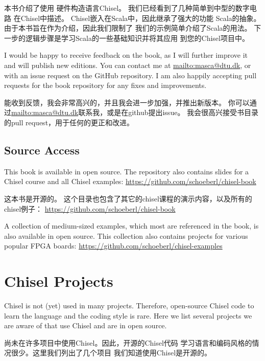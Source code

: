 \documentclass[%
    10pt,
    headinclude, footexclude,
    openright, %
    notitlepage,
    cleardoubleempty,
    headsepline,
    pointlessnumbers,
    bibtotoc, idxtotoc,
    ]{scrbook}
\begin{document}
{{本书介绍了使用
硬件构造语言Chisel。
我们已经看到了几种简单到中型的数字电路
在Chisel中描述。
Chisel嵌入在Scala中，因此继承了强大的功能
Scala的抽象。
由于本书旨在作为介绍，因此我们限制了
我们的示例简单介绍了Scala的用法。
下一步的逻辑步骤是学习Scala的一些基础知识并将其应用
到您的Chisel项目中。

I would be happy to receive feedback on the book, as I will further
improve it and will publish new editions. You can contact me at
\url{mailto:masca@dtu.dk}, or with an issue request on the GitHub
repository. I am also happily accepting pull requests
for the book repository for any fixes and improvements.

能收到反馈，我会非常高兴的，并且我会进一步加强，并推出新版本。
你可以通过\url{mailto:masca@dtu.dk}联系我，或是在github提出issue。
我会很高兴接受书目录的pull request，用于任何的更正和改进。

\section*{Source Access}

This book is available in open source.
The repository also contains slides for a Chisel course and
all Chisel examples: \url{https://github.com/schoeberl/chisel-book}

这本书是开源的。
这个目录也包含了其它的chisel课程的演示内容，以及所有的chisel例子：
\url{https://github.com/schoeberl/chisel-book}

A collection of medium-sized examples, which most are referenced
in the book, is also available in open source. This collection
also contains projects for various popular FPGA boards:
\url{https://github.com/schoeberl/chisel-examples}

\appendix

\chapter{Chisel Projects}

Chisel is not (yet) used in many projects. Therefore, open-source Chisel code
to learn the language and the coding style is rare. Here we list several projects
we are aware of that use Chisel and are in open source.

尚未在许多项目中使用Chisel。因此，开源的Chisel代码
学习语言和编码风格的情况很少。这里我们列出了几个项目
我们知道使用Chisel是开源的。

\begin{description}


\end{description}}}
\end{document}

